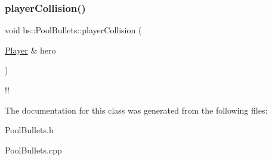 \subsubsection{\texorpdfstring{player\+Collision()}{playerCollision()}}
{\footnotesize\ttfamily void bs\+::\+Pool\+Bullets\+::player\+Collision (\begin{DoxyParamCaption}\item[{\hyperlink{class_player}{Player} \&}]{hero }\end{DoxyParamCaption})}

!! 

The documentation for this class was generated from the following files\+:\begin{DoxyCompactItemize}
\item 
Pool\+Bullets.\+h\item 
Pool\+Bullets.\+cpp\end{DoxyCompactItemize}
